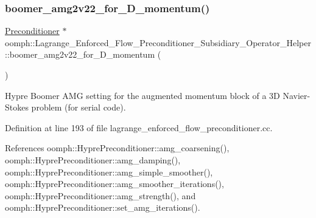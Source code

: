 \subsubsection{\texorpdfstring{boomer\+\_\+amg2v22\+\_\+for\+\_\+D\+\_\+momentum()}{boomer\_amg2v22\_for\_3D\_momentum()}}
{\footnotesize\ttfamily \hyperlink{classoomph_1_1Preconditioner}{Preconditioner} $\ast$ oomph\+::\+Lagrange\+\_\+\+Enforced\+\_\+\+Flow\+\_\+\+Preconditioner\+\_\+\+Subsidiary\+\_\+\+Operator\+\_\+\+Helper\+::boomer\+\_\+amg2v22\+\_\+for\+\_\+D\+\_\+momentum (\begin{DoxyParamCaption}{ }\end{DoxyParamCaption})}



Hypre Boomer A\+MG setting for the augmented momentum block of a 3D Navier-\/\+Stokes problem (for serial code). 



Definition at line 193 of file lagrange\+\_\+enforced\+\_\+flow\+\_\+preconditioner.\+cc.



References oomph\+::\+Hypre\+Preconditioner\+::amg\+\_\+coarsening(), oomph\+::\+Hypre\+Preconditioner\+::amg\+\_\+damping(), oomph\+::\+Hypre\+Preconditioner\+::amg\+\_\+simple\+\_\+smoother(), oomph\+::\+Hypre\+Preconditioner\+::amg\+\_\+smoother\+\_\+iterations(), oomph\+::\+Hypre\+Preconditioner\+::amg\+\_\+strength(), and oomph\+::\+Hypre\+Preconditioner\+::set\+\_\+amg\+\_\+iterations().

\mbox{\label{namespaceoomph_1_1Lagrange__Enforced__Flow__Preconditioner__Subsidiary__Operator__Helper_aeb0ebb2dda2361258334a18d279ade4f}} 
